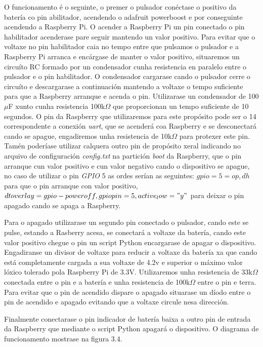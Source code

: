 \begin{itemize}
    O funcionamento é o seguinte, o premer o pulsador conéctase o positivo da batería co pin abilitador, acendendo o adafruit powerboost e por conseguinte acendendo a Raspberry Pi. O acender a Raspberry Pi un pin conectado o pin habilitador acenderase pare seguir mantendo un valor positivo. Para evitar que o voltaxe no pin habilitador caia no tempo entre que pulsamos o pulsador e a Raspberry Pi arranca e encárgase de manter o valor positivo, situaremos un circuíto RC formado por un condensador cunha resistencia en paralelo entre o pulsador e o pin habilitador. O condensador cargarase cando o pulsador cerre o circuíto e descargarase a continuación mantendo a voltaxe o tempo suficiente para que a Raspberry arranque e acenda o pin. Utilizarase un condensador de 100\(\mu\)F xunto cunha resistencia 100k\(\Omega\) que proporcionan un tempo suficiente de 10 segundos. O pin da Raspberry que utilizaremos para este propósito pode ser o 14 correspondente a conexión \emph{uart}, que se acenderá coa Raspberry e se desconectará cando se apague, engadiremos unha resistencia de 10k\(\Omega\) para protexer este pin. Tamén poderíase utilizar calquera outro pin de propósito xeral indicando no arquivo de configuración \emph{config.txt} na partición \emph{boot} da Raspberry, que o pin arranque cun valor positivo e cun valor negativo cando o dispositivo se apague, no caso de utilizar o pin \emph{GPIO} 5 as ordes serían as seguintes: \emph{$gpio=5=op,dh$} para que o pin arranque con valor positivo, \emph{$dtoverlay=gpio-poweroff,gpiopin=5,active_low="y"$} para deixar o pin apagado cando se apaga a Raspberry.

    Para o apagado utilizarase un segundo pin conectado o pulsador, cando este se pulse, estando a Rasberry acesa, se conectará a voltaxe da batería, cando este valor positivo chegue o pin un script Python encargarase de apagar o dispositivo. Engadiranse un divisor de voltaxe para reducir a voltaxe da batería xa que cando está completamente cargada a sua voltaxe de 4.2v e superior o máximo valor lóxico tolerado pola Raspberry Pi de 3.3V. Utilizaremos unha resistencia de 33k\(\Omega\) conectada entre o pin e a batería e unha resistencia de 100k\(\Omega\) entre o pin e terra. Para evitar que o pin de acendido dispare o apagado situarase un díodo entre o pin de acendido e apagado evitando que a voltaxe circule nesa dirección.

    Finalmente conectarase o pin indicador de batería baixa a outro pin de entrada da Raspberry que mediante o script Python apagará o dispositivo. O diagrama de funcionamento mostrase na figura 3.4.


\end{itemize}
